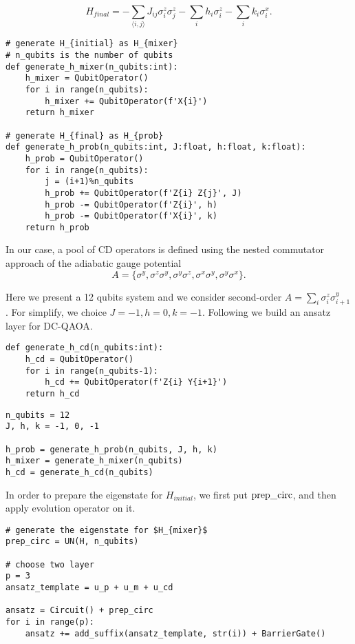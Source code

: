 \begin{equation}
    H_{final} = -\sum_{\langle i,j \rangle}J_{ij}\sigma_{i}^{z}\sigma_{j}^{z} - \sum_{i}h_{i}\sigma_{i}^{z} - \sum_{i}k_{i}\sigma_{i}^{x}.
\end{equation}
\begin{lstlisting}
# generate H_{initial} as H_{mixer}
# n_qubits is the number of qubits
def generate_h_mixer(n_qubits:int):
    h_mixer = QubitOperator()
    for i in range(n_qubits):
        h_mixer += QubitOperator(f'X{i}')
    return h_mixer

# generate H_{final} as H_{prob}
def generate_h_prob(n_qubits:int, J:float, h:float, k:float):
    h_prob = QubitOperator()
    for i in range(n_qubits):
        j = (i+1)%n_qubits
        h_prob += QubitOperator(f'Z{i} Z{j}', J)
        h_prob -= QubitOperator(f'Z{i}', h)
        h_prob -= QubitOperator(f'X{i}', k)
    return h_prob
\end{lstlisting}

In our case,  a pool of CD operators is defined using the nested commutator approach of the adiabatic gauge potential \cite{PhysRevResearch.4.013141}
$$A = \{\sigma^{y},\sigma^{z}\sigma^{y}, \sigma^{y}\sigma^{z}, \sigma^{x}\sigma^{y}, \sigma^{y}\sigma^{x} \}.$$

Here we present a 12 qubits system and we consider second-order $A = \sum_{i}\sigma_{i}^{z}\sigma_{i+1}^{y}$. For simplify, we choice  $J = -1, h = 0, k = -1$. Following we build an ansatz layer for DC-QAOA.
\begin{lstlisting}
def generate_h_cd(n_qubits:int):
    h_cd = QubitOperator()
    for i in range(n_qubits-1):
        h_cd += QubitOperator(f'Z{i} Y{i+1}')
    return h_cd
\end{lstlisting}

\begin{lstlisting}
n_qubits = 12
J, h, k = -1, 0, -1

h_prob = generate_h_prob(n_qubits, J, h, k)
h_mixer = generate_h_mixer(n_qubits)
h_cd = generate_h_cd(n_qubits)
\end{lstlisting}

In order to prepare the eigenstate for $H_{initial}$, we first put ${\rm prep\_circ}$, and then apply evolution operator on it.
\begin{lstlisting}
# generate the eigenstate for $H_{mixer}$
prep_circ = UN(H, n_qubits)

# choose two layer
p = 3
ansatz_template = u_p + u_m + u_cd

ansatz = Circuit() + prep_circ
for i in range(p):
    ansatz += add_suffix(ansatz_template, str(i)) + BarrierGate()
\end{lstlisting}


